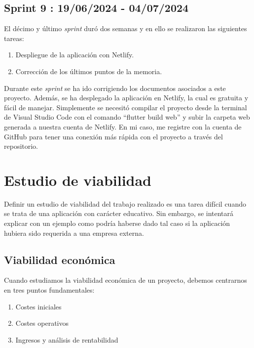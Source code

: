 \subsection{Sprint 9 : 19/06/2024 - 04/07/2024}

	El décimo y último \emph{sprint} duró dos semanas y en ello se realizaron las siguientes tareas:
	\begin{enumerate}
		\item Despliegue de la aplicación con Netlify.
		\item Corrección de los últimos puntos de la memoria.
	\end{enumerate}
	
	Durante este \emph{sprint} se ha ido corrigiendo los documentos asociados a este proyecto. Además, se ha desplegado la aplicación en Netlify, la cual es gratuita y fácil de manejar. Simplemente se necesitó compilar el proyecto desde la terminal de Visual Studio Code con el comando ``flutter build web'' y subir la carpeta web generada a nuestra cuenta de Netlify. En mi caso, me registre con la cuenta de GitHub para tener una conexión más rápida con el proyecto a través del repositorio. 
	
\section{Estudio de viabilidad}

	Definir un estudio de viabilidad del trabajo realizado es una tarea difícil cuando se trata de una aplicación con carácter educativo. Sin embargo, se intentará explicar con un ejemplo como podría haberse dado tal caso si la aplicación hubiera sido requerida a una empresa externa.

\subsection{Viabilidad económica}
	
	Cuando estudiamos la viabilidad económica de un proyecto, debemos centrarnos en tres puntos fundamentales:
	\begin{enumerate}
		\item Costes iniciales
		\item Costes operativos
		\item Ingresos y análisis de rentabilidad
	\end{enumerate}
	
